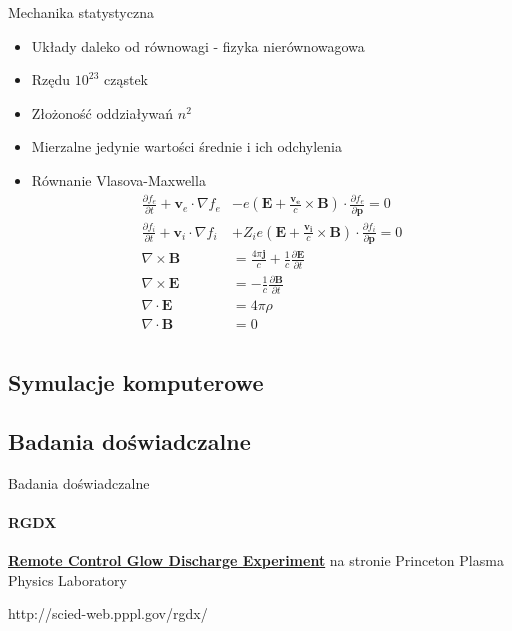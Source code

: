 \documentclass{beamer}
\begin{document}
\begin{frame}[t]{Mechanika statystyczna}
  \begin{itemize}[<+->]
    \item Układy daleko od równowagi - fizyka nierównowagowa
    \item Rzędu $10^{23}$ cząstek
    \item Złożoność oddziaływań $n^2$
    \item Mierzalne jedynie wartości średnie i ich odchylenia
    \item Równanie Vlasova-Maxwella
    \begin{align}
      \frac{\partial f_e}{\partial t} + \mathbf {v}_e\cdot\nabla f_e &- e\left(\mathbf {E}+\frac{\mathbf {v_e}}{c}\times\mathbf {B}\right)\cdot\frac{\partial f_e}{\partial\mathbf {p}} = 0 \\
      \frac{\partial f_i}{\partial t} + \mathbf {v}_i\cdot\nabla f_i &+ Z_i e\left(\mathbf {E}+\frac{\mathbf {v_i}}{c}\times\mathbf {B}\right)\cdot\frac{\partial f_i}{\partial\mathbf {p}} = 0 \\
      \nabla\times\mathbf {B} &=\frac{4\pi\mathbf {j}}{c}+\frac{1}{c}\frac{\partial\mathbf {E}}{\partial t} \\
      \nabla\times\mathbf {E} &=-\frac{1}{c}\frac{\partial\mathbf {B}}{\partial t} \\
      \nabla\cdot\mathbf {E}  &=4\pi\rho \\
      \nabla\cdot\mathbf {B}  &=0 \\
    \end{align}
  \end{itemize}
\end{frame}

\subsection{Symulacje komputerowe}

\subsection{Badania doświadczalne}
\begin{frame}[t]{Badania doświadczalne}
  \framesubtitle{RGDX}
  \href{http://scied-web.pppl.gov/rgdx/}{\textbf{Remote Control Glow Discharge Experiment}}
  na stronie Princeton Plasma Physics Laboratory

  http://scied-web.pppl.gov/rgdx/
\end{frame}
\end{document}
